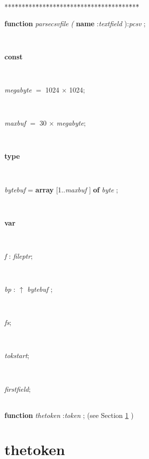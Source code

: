 \begin{tabbing}
***\=***\=***\=***\=***\=***\=***\=***\=***\=***\=***\=***\=***\=\kill
\parbox{14cm}{\textsf{\textbf{function}  \textit{parsecsvfile} \textit{(} \textbf{name} :\textit{textfield} ):\textit{pcsv} ;}}\\
\+\parbox{14cm}{\textsf{\textbf{const} }}\\
\parbox{14cm}{\textsf{\textit{megabyte} $=$ 1024 $\times$ 1024}; }\\
\parbox{14cm}{\textsf{\textit{maxbuf} $=$ 30 $\times$ \textit{megabyte}}; }\\
\<\parbox{14cm}{\textsf{\textbf{type} }}\\
\parbox{14cm}{\textsf{\textit{bytebuf}  = \textbf{array} [1..\textit{maxbuf} ] \textbf{of}  \textit{byte} ;}}\\
\<\parbox{14cm}{\textsf{\textbf{var} }}\\
\parbox{14cm}{\textsf{\textit{f} : \textit{fileptr}}; }\\
\parbox{14cm}{\textsf{\textit{bp} : $\uparrow$ \textit{bytebuf} }; }\\
\parbox{14cm}{\textsf{\textit{fs}}; }\\
\parbox{14cm}{\textsf{\textit{tokstart}}; }\\
\parbox{14cm}{\textsf{\textit{firstfield}}; }\\
\<\textsf{\textbf{function}  \textit{thetoken} :\textit{token} ;} (see Section \ref{sec:csvfilereader/getdatamatrix/recursedown/recurse/getcolheaders/recurse/getrowheaders/recurse/colcount/getcell/removetrailingnull/onlynulls/rowcount/isint/printcsv/parsecsvfilethetoken} )\\
\end{tabbing}
\section{thetoken}\label{sec:csvfilereader/getdatamatrix/recursedown/recurse/getcolheaders/recurse/getrowheaders/recurse/colcount/getcell/removetrailingnull/onlynulls/rowcount/isint/printcsv/parsecsvfilethetoken}

